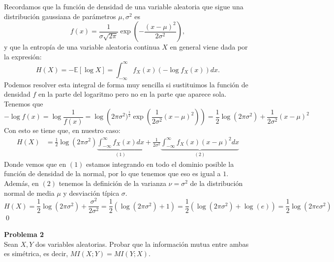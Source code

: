 \documentclass[a4paper]{article}
\newenvironment{problem}[2][Problema]
    { \begin{mdframed}[backgroundcolor=gray!20] \textbf{#1 #2} \\}
    {  \end{mdframed}}
\newcommand{\gaussian}{\frac{1}{\sigma\sqrt{2\pi}}\exp\left(- \frac{(x-\mu)^2}{2\sigma^2}\right)}
\begin{document}
Recordamos que la función de densidad de una variable aleatoria que sigue una distribución gaussiana de parámetros $\mu,\sigma^2$ es
\[
f(x) = \gaussian ,    
\]
y que la entropía de una variable aleatoria continua $X$ en general viene dada por la expresión:
\[
H(X) = - \mathbb E \left[\log X\right] = \int_{-\infty}^\infty f_X(x) \left(-\log f_X(x)\right) dx.
\]
Podemos resolver esta integral de forma muy sencilla si sustituimos la función de densidad $f$ en la parte del logaritmo pero no en la parte que aparece sola. Tenemos que
\[
-\log f(x) = \log \frac{1}{f(x)} = \log  \left(2 \pi \sigma^2)^{\frac{1}{2}} \exp \left( \frac{1}{2\sigma^2}(x-\mu)^2 \right) \right) = \frac{1}{2} \log \left( 2\pi \sigma^2 \right) + \frac{1}{2\sigma^2} (x-\mu)^2
\]
Con esto se tiene que, en nuestro caso:
\begin{align*}
  H(X) %
  & = \frac{1}{2} \log \left(2\pi \sigma^2\right) \underbrace{\int_{-\infty}^\infty f_X(x) dx}_{(1)} +  \frac{1}{2\sigma^2}  \underbrace{\int_{-\infty}^\infty f_X(x)(x-\mu)^2 dx}_{(2)}
\end{align*}
Donde vemos que en $(1)$ estamos integrando en todo el dominio posible la función de densidad de la normal, por lo que tenemos que eso es igual a $1$. Además, en $(2)$ tenemos la definición de la varianza $\nu = \sigma^2$ de la distribución normal de media $\mu$ y desviación típica $\sigma$.
\[
H(X) = \frac{1}{2} \log \left(2\pi \sigma^2\right) +  \frac{\sigma^2}{2\sigma^2} = \frac{1}{2}\left(\log \left(2\pi \sigma^2\right) + 1 \right) = \frac{1}{2}\left(\log \left(2\pi \sigma^2\right) + \log(e) \right) = \frac{1}{2}\log \left(2\pi e \sigma^2\right)  
\]
\qed


\begin{problem}{2}

 Sean $X,Y$ dos variables aleatorias. Probar que la información mutua entre ambas es simétrica, es decir, $MI(X;Y) = MI(Y;X)$.\\

\end{problem}
\end{document}
